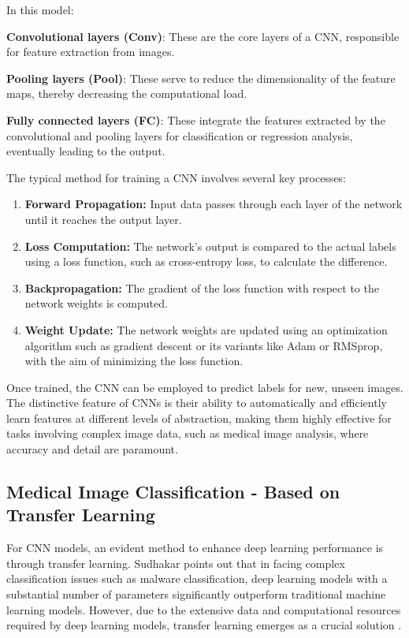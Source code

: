 In this model:

\textbf{Convolutional layers (Conv)}: These are the core layers of a CNN, responsible for feature extraction from images.

\textbf{Pooling layers (Pool)}: These serve to reduce the dimensionality of the feature maps, thereby decreasing the computational load.

\textbf{Fully connected layers (FC)}: These integrate the features extracted by the convolutional and pooling layers for classification or regression analysis, eventually leading to the output.

The typical method for training a CNN involves several key processes:\cite{4.30 2}

\begin{enumerate}
    \item \textbf{Forward Propagation:} Input data passes through each layer of the network until it reaches the output layer.
    \item \textbf{Loss Computation:} The network's output is compared to the actual labels using a loss function, such as cross-entropy loss, to calculate the difference.
    \item \textbf{Backpropagation:} The gradient of the loss function with respect to the network weights is computed.
    \item \textbf{Weight Update:} The network weights are updated using an optimization algorithm such as gradient descent or its variants like Adam or RMSprop, with the aim of minimizing the loss function.
\end{enumerate}

Once trained, the CNN can be employed to predict labels for new, unseen images. The distinctive feature of CNNs is their ability to automatically and efficiently learn features at different levels of abstraction, making them highly effective for tasks involving complex image data, such as medical image analysis, where accuracy and detail are paramount\cite{4.30 3}.

\subsection{Medical Image Classification - Based on Transfer Learning}

For CNN models, an evident method to enhance deep learning performance is through transfer learning. Sudhakar points out that in facing complex classification issues such as malware classification, deep learning models with a substantial number of parameters significantly outperform traditional machine learning models. However, due to the extensive data and computational resources required by deep learning models, transfer learning emerges as a crucial solution \cite{5.1 2}.

